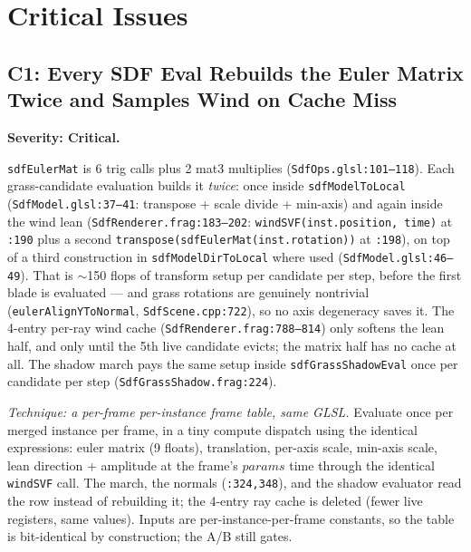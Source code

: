 \documentclass[11pt,a4paper]{article}
\begin{document}
\section{Critical Issues}

\subsection{C1: Every SDF Eval Rebuilds the Euler Matrix Twice and Samples Wind on Cache Miss}
\label{sec:c1}

\textbf{Severity: Critical.}

\texttt{sdfEulerMat} is 6 trig calls plus 2 mat3 multiplies
(\texttt{SdfOps.glsl:101--118}). Each grass-candidate evaluation builds it
\emph{twice}: once inside \texttt{sdfModelToLocal}
(\texttt{SdfModel.glsl:37--41}: transpose + scale divide + min-axis) and
again inside the wind lean (\texttt{SdfRenderer.frag:183--202}:
\texttt{windSVF(inst.position, time)} at \texttt{:190} plus a second
\texttt{transpose(sdfEulerMat(inst.rotation))} at \texttt{:198}), on top of
a third construction in \texttt{sdfModelDirToLocal} where used
(\texttt{SdfModel.glsl:46--49}). That is $\sim$150 flops of transform
setup per candidate per step, before the first blade is evaluated --- and
grass rotations are genuinely nontrivial
(\texttt{eulerAlignYToNormal}, \texttt{SdfScene.cpp:722}), so no axis
degeneracy saves it. The 4-entry per-ray wind cache
(\texttt{SdfRenderer.frag:788--814}) only softens the lean half, and only
until the 5th live candidate evicts; the matrix half has no cache at all.
The shadow march pays the same setup inside
\texttt{sdfGrassShadowEval} once per candidate per step
(\texttt{SdfGrassShadow.frag:224}).

\textit{Technique: a per-frame per-instance frame table, same GLSL.}
Evaluate once per merged instance per frame, in a tiny compute dispatch
using the identical expressions: euler matrix (9 floats), translation,
per-axis scale, min-axis scale, lean direction + amplitude at the frame's
$params$ time through the identical \texttt{windSVF} call. The march, the
normals (\texttt{:324,348}), and the shadow evaluator read the row instead
of rebuilding it; the 4-entry ray cache is deleted (fewer live registers,
same values). Inputs are per-instance-per-frame constants, so the table is
bit-identical by construction; the A/B still gates.
\end{document}

